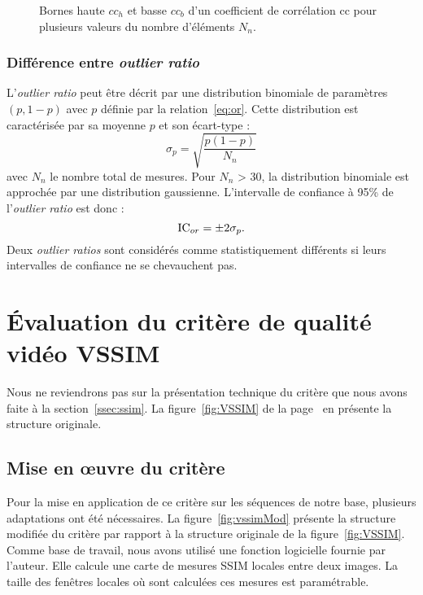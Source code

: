 \begin{figure}[htbp]
	\centering
	
	\caption{Bornes haute $cc_h$ et basse $cc_b$ d'un coefficient de corrélation cc pour plusieurs valeurs du nombre d'éléments $N_n$.}
	\label{fig:plotICcc}
\end{figure}


\subsubsection{Différence entre \emph{outlier ratio}}
L'\emph{outlier ratio} peut être décrit par une distribution binomiale de paramètres $(p, 1-p)$ avec $p$ définie par la relation~\ref{eq:or}. Cette distribution est caractérisée par sa moyenne $p$ et son écart-type :
\begin{equation}
\sigma_p = \sqrt{\frac{p(1-p)}{N_n}}
\end{equation}
%
avec $N_n$ le nombre total de mesures. Pour $N_n$ > 30, la distribution binomiale est approchée par une distribution gaussienne. L'intervalle de confiance à 95\% de l'\emph{outlier ratio} est donc :
\begin{equation}
\text{IC}_{or} = \pm 2\sigma_p.
\end{equation}
%
Deux \emph{outlier ratios} sont considérés comme statistiquement différents si leurs intervalles de confiance ne se chevauchent pas.


\section{Évaluation du critère de qualité vidéo VSSIM}
Nous ne reviendrons pas sur la présentation technique du critère que nous avons faite à la section~\ref{ssec:ssim}. La figure~\ref{fig:VSSIM} de la page~\pageref{fig:VSSIM} en présente la structure originale. %


\subsection{Mise en \oe uvre du critère}
Pour la mise en application de ce critère sur les séquences de notre base, plusieurs adaptations ont été nécessaires. La figure~\ref{fig:vssimMod} présente la structure modifiée du critère par rapport à la structure originale de la figure~\ref{fig:VSSIM}. Comme base de travail, nous avons utilisé une fonction logicielle fournie par l'auteur. Elle calcule une carte de mesures SSIM locales entre deux images. La taille des fenêtres locales où sont calculées ces mesures est paramétrable.

